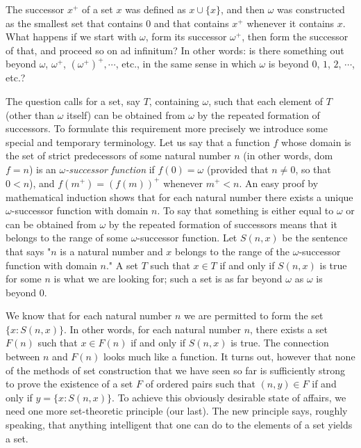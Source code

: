 
The successor $x^{+}$ of a set $x$ was defined as $x \cup \{ x \} $, and then $\omega$ was constructed as the smallest set that contains $0$ and that contains $x^{+}$ whenever it contains $x$. What happens if we start with $\omega$, form its successor $\omega^{+}$, then form the successor of that, and proceed so on ad infinitum? In other words: is there something out beyond $\omega$, $\omega^{+}$, $(\omega^{+})^{+}, \cdots$, etc., in the same sense in which $\omega$ is beyond $0$, $1$, $2$, $\cdots$, etc.? 

The question calls for a set, say $T$, containing $\omega$, such that each element of $T$ (other than $\omega$ itself) can be obtained from $\omega$ by the repeated formation of successors. To formulate this requirement more precisely we introduce some special and temporary terminology. Let us say that a function $f$ whose domain is the set of strict predecessors of some natural number $n$  (in other words, dom $f = n$) is an \textit{$\omega$-successor function} if $f(0) = \omega$ (provided that $n \neq 0$, so that $0 < n$), and $f(m^{+}) = (f(m))^{+}$ whenever $m^{+} < n$. An easy proof by mathematical induction shows that for each natural number there exists a unique $\omega$-successor function with domain $n$. To say that something is either equal to $\omega$ or can be obtained from $\omega$ by the repeated formation of successors means that it belongs to the range of some $\omega$-successor function. Let $S(n,x)$ be the sentence that says "$n$ is a natural number and $x$ belongs to the range of the $\omega$-successor function with domain $n$." A set $T$ such that $x \in T$ if and only if $S(n,x)$ is true for some $n$ is what we are looking for; such a set is as far beyond $\omega$ as $\omega$ is beyond $0$. 

We know that for each natural number $n$ we are permitted to form the set $\{ x: S(n,x) \}$. In other words, for each natural number $n$, there exists a set $F(n)$ such that $x \in F(n)$ if and only if $S(n,x)$ is true. The connection between $n$ and $F(n)$ looks much like a function. It turns out, however that none of the methods of set construction that we have seen so far is sufficiently strong to prove the existence of a set $F$ of ordered pairs such that $(n, y) \in F$ if and only if $y = \{ x: S(n,x) \}$. To achieve this obviously desirable state of affairs, we need one more set-theoretic principle (our last). The new principle says, roughly speaking, that anything intelligent that one can do to the elements of a set yields a set.

